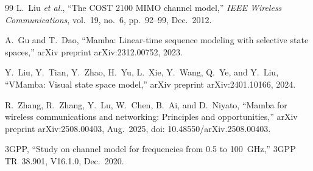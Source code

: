 \documentclass[conference]{IEEEtran}
\begin{document}
\begin{thebibliography}{99}
L.~Liu \emph{et al.},
``The COST 2100 MIMO channel model,''
\emph{IEEE Wireless Communications}, vol.~19, no.~6, pp.~92--99, Dec.~2012.

A.~Gu and T.~Dao,
``Mamba: Linear-time sequence modeling with selective state spaces,''
arXiv preprint arXiv:2312.00752, 2023.

Y.~Liu, Y.~Tian, Y.~Zhao, H.~Yu, L.~Xie, Y.~Wang, Q.~Ye, and Y.~Liu,
``VMamba: Visual state space model,''
arXiv preprint arXiv:2401.10166, 2024.

R.~Zhang, R.~Zhang, Y.~Lu, W.~Chen, B.~Ai, and D.~Niyato,
``Mamba for wireless communications and networking: Principles and opportunities,''
arXiv preprint arXiv:2508.00403, Aug.~2025, doi: 10.48550/arXiv.2508.00403.

3GPP,
``Study on channel model for frequencies from 0.5 to 100~GHz,''
3GPP TR~38.901, V16.1.0, Dec.~2020.

\end{thebibliography}
\end{document}
